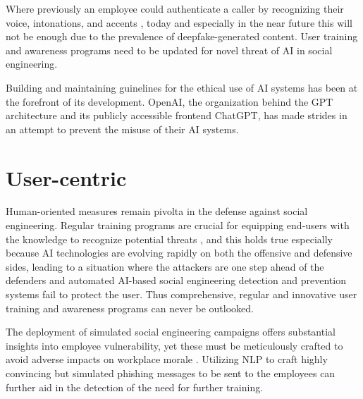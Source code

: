 Where previously an employee could authenticate a caller by recognizing their voice, intonations, and accents \citep{mitnickArtDeceptionControlling2003}, today and especially in the near future this will not be enough due to the prevalence of deepfake-generated content. User training and awareness programs need to be updated for novel threat of AI in social engineering.

Building and maintaining guinelines for the ethical use of AI systems has been at the forefront of its development. OpenAI, the organization behind the GPT architecture and its publicly accessible frontend ChatGPT, has made strides in an attempt to prevent the misuse of their AI systems.
















\section{User-centric}

\begin{comment}    
    - Deepfake content detection
    - Spear phishing detection
\end{comment}

Human-oriented measures remain pivolta in the defense against social engineering. Regular training programs are crucial for equipping end-users with the knowledge to recognize potential threats \citep{hadnagySocialEngineering2018}, and this holds true especially because AI technologies are evolving rapidly on both the offensive and defensive sides, leading to a situation where the attackers are one step ahead of the defenders and automated AI-based social engineering detection and prevention systems fail to protect the user.  Thus comprehensive, regular and innovative user training and awareness programs can never be outlooked.

The deployment of simulated social engineering campaigns offers substantial insights into employee vulnerability, yet these must be meticulously crafted to avoid adverse impacts on workplace morale \citep{mitnickArtDeceptionControlling2003}. Utilizing NLP to craft highly convincing but simulated phishing messages to be sent to the employees can further aid in the detection of the need for further training.


